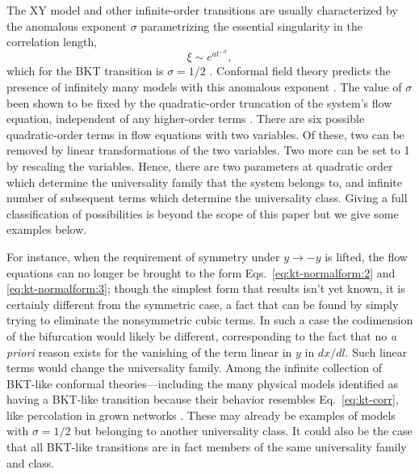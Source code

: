 \documentclass[
 reprint,
 amsmath,amssymb,
 aps, superscriptaddress, pre
]{revtex4-1}
\begin{document}
The XY model and other infinite-order transitions are usually characterized by
the anomalous exponent $\sigma$ parametrizing the essential singularity in the
correlation length,
\begin{equation}
  \xi\sim e^{at^{-\sigma}},
  \label{eq:kt-corr}
\end{equation}
which for the BKT transition is $\sigma=1/2$ \cite{kosterlitz1974critical}.
Conformal field theory predicts the presence of infinitely many models with
this anomalous exponent \cite{ginsparg1988applied}.
The value of $\sigma$ been shown to be fixed by the quadratic-order truncation
of the system's flow equation, independent of any higher-order terms
\cite{itoi1999renormalization}. There are six possible quadratic-order terms in flow equations with two variables. Of these, two can be removed by linear transformations of the two variables. Two more can be set to 1 by rescaling the variables. Hence, there are two parameters at quadratic order which determine the universality family that the system belongs to, and infinite number of subsequent terms which determine the universality class. Giving a full classification of possibilities is beyond the scope of this paper but we give some examples below.


For instance, when the requirement of symmetry under $y\to-y$ is lifted, the
flow equations can no longer be brought to the form Eqs.~\eqref{eq:kt-normalform:2}
and \eqref{eq:kt-normalform:3}; though the simplest form that results isn't
yet known, it is certainly different from the symmetric case, a fact that can
be found by simply trying to eliminate the nonsymmetric cubic terms. In such a
case the codimension of the bifurcation would likely be different, corresponding
to the fact that no \emph{a priori} reason exists for the vanishing of
the term linear in $y$ in $dx/dl$. Such linear terms would change the universality family. Among the infinite collection of BKT-like
conformal theories---including the many physical models identified as having a
BKT-like transition because their behavior resembles Eq.~\eqref{eq:kt-corr}, like
percolation in grown networks \cite{callaway2001randomly,
dorogovtsev2001anomalous}. These may already be examples of models with
$\sigma=1/2$ but belonging to another universality class. It could
also be the case that all BKT-like transitions are in fact members of the same
universality family and class.
\end{document}
